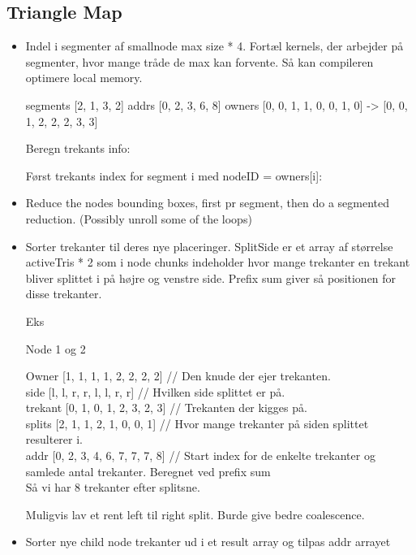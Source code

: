\subsection{Triangle Map}

\begin{itemize}
\item
Indel i segmenter af smallnode max size * 4. Fortæl kernels, der
arbejder på segmenter, hvor mange tråde de max kan forvente. Så kan
compileren optimere local memory.

segments [2, 1, 3, 2]
addrs    [0, 2, 3, 6, 8]
owners   [0, 0, 1, 1, 0, 0, 1, 0] -> [0, 0, 1, 2, 2, 2, 3, 3]

Beregn trekants info:

Først trekants index for segment i med nodeID = owners[i]:



\item
Reduce the nodes bounding boxes, first pr segment, then do a segmented
reduction. (Possibly unroll some of the loops)

\item
Sorter trekanter til deres nye placeringer. SplitSide er et array af
størrelse activeTris * 2 som i node chunks indeholder hvor mange
trekanter en trekant bliver splittet i på højre og venstre
side. Prefix sum giver så positionen for disse trekanter.

Eks

Node 1 og 2

Owner     [1, 1, 1, 1, 2, 2, 2, 2] // Den knude der ejer trekanten.\\
side      [l, l, r, r, l, l, r, r] // Hvilken side splittet er på.\\
trekant   [0, 1, 0, 1, 2, 3, 2, 3] // Trekanten der kigges på.\\
splits    [2, 1, 1, 2, 1, 0, 0, 1] // Hvor mange trekanter på siden splittet resulterer i.\\
addr      [0, 2, 3, 4, 6, 7, 7, 7, 8] // Start index for de enkelte trekanter og samlede antal trekanter. Beregnet ved prefix sum\\

Så vi har 8 trekanter efter splitsne.

Muligvis lav et rent left til right split. Burde give bedre coalescence.

\item
Sorter nye child node trekanter ud i et result array og tilpas addr arrayet


\end{itemize}
